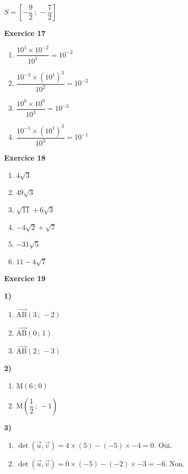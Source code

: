 \documentclass[12pt,a4paper,french]{article}
\begin{document}
\begin{center}
\end{center}
\par\smallskip
\begin{center}$S = \left[ - \dfrac{9}{2} \,;\, - \dfrac{7}{2} \right]$\end{center}\par\medskip
\medskip

\noindent\textbf{Exercice 17}\par
\smallskip
\begin{enumerate}
\item $\dfrac{10^{1} \times 10^{-2}}{10^{1}} = 10^{-2}$
\item $\dfrac{10^{-3} \times (10^{1})^{3}}{10^{2}} = 10^{-2}$
\item $\dfrac{10^{0} \times 10^{0}}{10^{3}} = 10^{-3}$
\item $\dfrac{10^{-1} \times (10^{1})^{3}}{10^{3}} = 10^{-1}$
\end{enumerate}
\medskip

\noindent\textbf{Exercice 18}\par
\smallskip
\begin{enumerate}
\item $4 \sqrt{3}$
\item $49 \sqrt{3}$
\item $\sqrt{11} + 6 \sqrt{3}$
\item $- 4 \sqrt{2} + \sqrt{7}$
\item $- 31 \sqrt{5}$
\item $11 - 4 \sqrt{7}$
\end{enumerate}
\medskip

\noindent\textbf{Exercice 19}\par
\smallskip
\textbf{1)}
\begin{enumerate}
\item $\overrightarrow{\ensuremath{\mathrm{A}}\ensuremath{\mathrm{B}}}(3\,;\,-2)$
\item $\overrightarrow{\ensuremath{\mathrm{A}}\ensuremath{\mathrm{B}}}(0\,;\,1)$
\item $\overrightarrow{\ensuremath{\mathrm{A}}\ensuremath{\mathrm{B}}}(2\,;\,-3)$
\end{enumerate}
\textbf{2)}
\begin{enumerate}
\item $\ensuremath{\mathrm{M}}\left(6\,;\,0\right)$
\item $\ensuremath{\mathrm{M}}\left(\dfrac{1}{2}\,;\,-1\right)$
\end{enumerate}
\textbf{3)}
\begin{enumerate}
\item $\det(\vec{u},\vec{v}) = 4\times(5)-(-5)\times-4 = 0$. Oui.
\item $\det(\vec{u},\vec{v}) = 0\times(-5)-(-2)\times-3 = -6$. Non.
\end{enumerate}
\medskip
\end{document}
